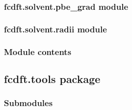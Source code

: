 \documentclass[letterpaper,10pt,english]{sphinxmanual}
\begin{document}

\begin{fulllineitems}
\label{\detokenize{fcdft.solvent:fcdft.solvent.pbe.pbe_for_scf}}
\pysigstartsignatures
\pysiglinewithargsret
{}
{\sphinxparamcomma {}\sphinxparamcomma {}}
{}
\pysigstopsignatures
\end{fulllineitems}



\subsubsection{fcdft.solvent.pbe\_grad module}
\label{\detokenize{fcdft.solvent:fcdft-solvent-pbe-grad-module}}

\subsubsection{fcdft.solvent.radii module}
\label{\detokenize{fcdft.solvent:module-fcdft.solvent.radii}}\label{\detokenize{fcdft.solvent:fcdft-solvent-radii-module}}

\subsubsection{Module contents}
\label{\detokenize{fcdft.solvent:module-fcdft.solvent}}\label{\detokenize{fcdft.solvent:module-contents}}
\sphinxstepscope


\subsection{fcdft.tools package}
\label{\detokenize{fcdft.tools:fcdft-tools-package}}\label{\detokenize{fcdft.tools::doc}}

\subsubsection{Submodules}
\label{\detokenize{fcdft.tools:submodules}}
\end{document}
